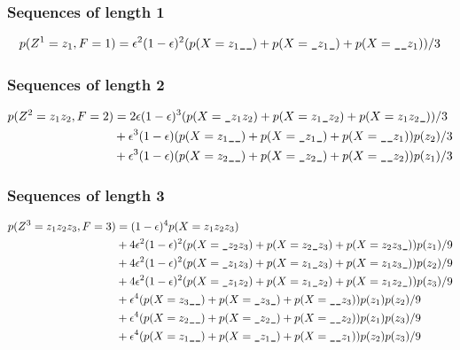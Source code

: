 \subsubsection{Sequences of length 1}

\begin{equation*}
  p(Z^1=z_1,F=1) = \eps^2(1-\eps)^2(p(X=z_1\s\s) + p(X=\s z_1\s) + p(X=\s\s z_1)) / 3
\end{equation*}

\subsubsection{Sequences of length 2}

\begin{equation*}
  \begin{split}
    p(Z^2=z_1z_2,F=2)
        &= 2\eps(1-\eps)^3(p(X=\s z_1z_2) + p(X=z_1\s z_2) + p(X=z_1z_2\s))/3\\
        &+ \eps^3(1-\eps)(p(X=z_1\s\s) + p(X=\s z_1\s) + p(X=\s\s z_1))p(z_2)/3\\
        &+ \eps^3(1-\eps)(p(X=z_2\s\s) + p(X=\s z_2\s) + p(X=\s\s z_2))p(z_1)/3
  \end{split}
\end{equation*}

\subsubsection{Sequences of length 3}

\begin{equation*}
  \begin{split}
    p(Z^3=z_1z_2z_3,F=3) &= (1-\eps)^4 p(X=z_1z_2z_3)\\
        &+ 4\eps^2(1-\eps)^2 (p(X=\s z_2 z_3) + p(X=z_2\s z_3) + p(X=z_2 z_3\s))p(z_1)/9\\
        &+ 4\eps^2(1-\eps)^2 (p(X=\s z_1 z_3) + p(X=z_1\s z_3) + p(X=z_1 z_3\s))p(z_2)/9\\
        &+ 4\eps^2(1-\eps)^2 (p(X=\s z_1 z_2) + p(X=z_1\s z_2) + p(X=z_1 z_2\s))p(z_3)/9\\
        &+ \eps^4 (p(X=z_3\s\s) + p(X=\s z_3\s) + p(X=\s\s z_3))p(z_1)p(z_2)/9\\
        &+ \eps^4 (p(X=z_2\s\s) + p(X=\s z_2\s) + p(X=\s\s z_2))p(z_1)p(z_3)/9\\
        &+ \eps^4 (p(X=z_1\s\s) + p(X=\s z_1\s) + p(X=\s\s z_1))p(z_2)p(z_3)/9
  \end{split}
\end{equation*}

